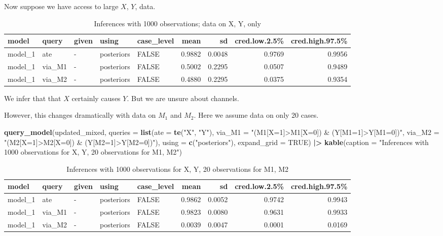\documentclass[
  12pt,
]{book}
\newenvironment{Shaded}{\begin{snugshade}}{\end{snugshade}}
\newcommand{\AttributeTok}[1]{\textcolor[rgb]{0.13,0.29,0.53}{#1}}
\newcommand{\ConstantTok}[1]{\textcolor[rgb]{0.56,0.35,0.01}{#1}}
\newcommand{\FunctionTok}[1]{\textcolor[rgb]{0.13,0.29,0.53}{\textbf{#1}}}
\newcommand{\NormalTok}[1]{#1}
\newcommand{\SpecialCharTok}[1]{\textcolor[rgb]{0.81,0.36,0.00}{\textbf{#1}}}
\newcommand{\StringTok}[1]{\textcolor[rgb]{0.31,0.60,0.02}{#1}}
\begin{document}
Now suppose we have access to large \(X\), \(Y\), data.

\begin{table}

\caption{\label{tab:apppath4}Inferences with 1000 observations; data on X, Y, only}
\centering
\begin{tabular}[t]{l|l|l|l|l|r|r|r|r}
\hline
model & query & given & using & case\_level & mean & sd & cred.low.2.5\% & cred.high.97.5\%\\
\hline
model\_1 & ate & - & posteriors & FALSE & 0.9882 & 0.0048 & 0.9769 & 0.9956\\
\hline
model\_1 & via\_M1 & - & posteriors & FALSE & 0.5002 & 0.2295 & 0.0507 & 0.9489\\
\hline
model\_1 & via\_M2 & - & posteriors & FALSE & 0.4880 & 0.2295 & 0.0375 & 0.9354\\
\hline
\end{tabular}
\end{table}

We infer that that \(X\) certainly causes \(Y\). But we are unsure about channels.

However, this changes dramatically with data on \(M_1\) and \(M_2\). Here we assume data on only 20 cases.

\begin{Shaded}
\begin{Highlighting}[]
\FunctionTok{query\_model}\NormalTok{(updated\_mixed, }
  \AttributeTok{queries =} \FunctionTok{list}\NormalTok{(}\AttributeTok{ate =} \FunctionTok{te}\NormalTok{(}\StringTok{"X"}\NormalTok{, }\StringTok{"Y"}\NormalTok{), }
                 \AttributeTok{via\_M1 =} \StringTok{"(M1[X=1]\textgreater{}M1[X=0]) \& (Y[M1=1]\textgreater{}Y[M1=0])"}\NormalTok{, }
                 \AttributeTok{via\_M2 =} \StringTok{"(M2[X=1]\textgreater{}M2[X=0]) \& (Y[M2=1]\textgreater{}Y[M2=0])"}\NormalTok{), }
  \AttributeTok{using =} \FunctionTok{c}\NormalTok{(}\StringTok{"posteriors"}\NormalTok{),}
  \AttributeTok{expand\_grid =} \ConstantTok{TRUE}\NormalTok{)  }\SpecialCharTok{|\textgreater{}} \FunctionTok{kable}\NormalTok{(}\AttributeTok{caption =} \StringTok{"Inferences with 1000 observations for X, Y,  20 observations for M1, M2"}\NormalTok{)}
\end{Highlighting}
\end{Shaded}

\begin{table}

\caption{\label{tab:apppaths6}Inferences with 1000 observations for X, Y,  20 observations for M1, M2}
\centering
\begin{tabular}[t]{l|l|l|l|l|r|r|r|r}
\hline
model & query & given & using & case\_level & mean & sd & cred.low.2.5\% & cred.high.97.5\%\\
\hline
model\_1 & ate & - & posteriors & FALSE & 0.9862 & 0.0052 & 0.9742 & 0.9943\\
\hline
model\_1 & via\_M1 & - & posteriors & FALSE & 0.9823 & 0.0080 & 0.9631 & 0.9933\\
\hline
model\_1 & via\_M2 & - & posteriors & FALSE & 0.0039 & 0.0047 & 0.0001 & 0.0169\\
\hline
\end{tabular}
\end{table}
\end{document}
